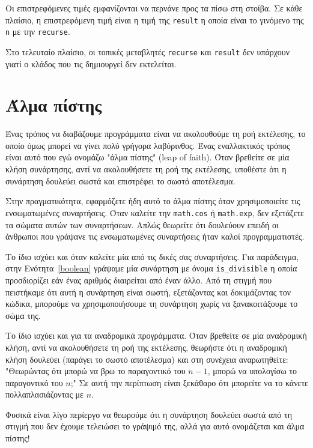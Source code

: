 \documentclass[10pt]{book}
\begin{document}
Οι επιστρεφόμενες τιμές εμφανίζονται να περνάνε προς τα πίσω στη στοίβα.
Σε κάθε πλαίσιο, η επιστρεφόμενη τιμή είναι η τιμή της {\tt result} 
η οποία είναι το γινόμενο της {\tt n} με την {\tt recurse}.
 


Στο τελευταίο πλαίσιο, οι τοπικές μεταβλητές 
{\tt recurse} και {\tt result} δεν υπάρχουν γιατί
ο κλάδος που τις δημιουργεί δεν εκτελείται.


\section{Άλμα πίστης}

Ένας τρόπος να διαβάζουμε προγράμματα είναι να ακολουθούμε τη ροή εκτέλεσης,
το οποίο όμως μπορεί να γίνει πολύ γρήγορα λαβύρινθος. Ένας εναλλακτικός τρόπος
είναι αυτό που εγώ ονομάζω "άλμα πίστης" (leap of faith). 
Όταν βρεθείτε σε μία κλήση συνάρτησης, αντί να ακολουθήσετε τη ροή της εκτέλεσης, υποθέστε ότι η συνάρτηση δουλεύει σωστά και επιστρέφει το σωστό αποτέλεσμα.

Στην πραγματικότητα, εφαρμόζετε ήδη αυτό το άλμα πίστης όταν χρησιμοποιείτε
τις ενσωματωμένες συναρτήσεις. Όταν καλείτε την {\tt math.cos} ή 
{\tt math.exp}, δεν εξετάζετε τα σώματα αυτών των συναρτήσεων. Απλώς
θεωρείτε ότι δουλεύουν επειδή οι άνθρωποι που γράψανε τις ενσωματωμένες
συναρτήσεις ήταν καλοί προγραμματιστές.

Το ίδιο ισχύει και όταν καλείτε μία από τις δικές σας συναρτήσεις. Για
παράδειγμα, στην Ενότητα~\ref{boolean} γράψαμε μία συνάρτηση με
όνομα \verb"is_divisible" η οποία προσδιορίζει εάν ένας αριθμός
διαιρείται από έναν άλλο. Από τη στιγμή που πειστήκαμε ότι αυτή η συνάρτηση
είναι σωστή, εξετάζοντας και δοκιμάζοντας τον κώδικα, μπορούμε να χρησιμοποιήσουμε τη συνάρτηση χωρίς να ξανακοιτάξουμε το σώμα της.

Το ίδιο ισχύει και για τα αναδρομικά προγράμματα. Όταν βρεθείτε σε μία
αναδρομική κλήση, αντί να ακολουθήσετε τη ροή της εκτέλεσης,
θεωρήστε ότι η αναδρομική κλήση δουλεύει (παράγει το σωστό αποτέλεσμα)
και στη συνέχεια αναρωτηθείτε: "Θεωρώντας ότι μπορώ να βρω το παραγοντικό
του $n-1$, μπορώ να υπολογίσω το παραγοντικό του $n$;" Σε αυτή την
περίπτωση είναι ξεκάθαρο ότι μπορείτε να το κάνετε πολλαπλασιάζοντας με $n$.

Φυσικά είναι λίγο περίεργο να θεωρούμε ότι η συνάρτηση δουλεύει σωστά
από τη στιγμή που δεν έχουμε τελειώσει το γράψιμό της, αλλά για αυτό
ονομάζεται και άλμα πίστης!
\end{document}
